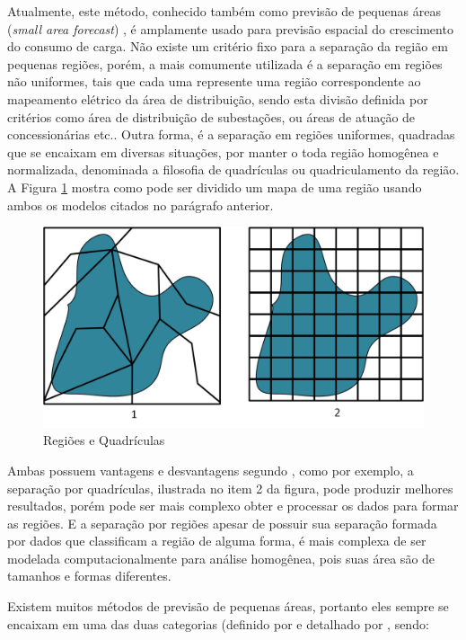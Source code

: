 Atualmente, este método, conhecido também como previsão de pequenas áreas (\emph{small area forecast}) \cite{willis1995spatial}, é amplamente usado para previsão espacial do crescimento do consumo de carga. Não existe um critério fixo para a separação da região em pequenas regiões, porém, a mais comumente utilizada é a separação em regiões não uniformes, tais que cada uma represente uma região correspondente ao mapeamento elétrico da área de distribuição, sendo esta divisão definida por critérios como área de distribuição de subestações, ou áreas de atuação de concessionárias etc.. Outra forma, é a separação em regiões uniformes, quadradas que se encaixam em diversas situações, por manter o toda região homogênea e normalizada, denominada a filosofia de quadrículas ou quadriculamento da região. A Figura \ref{fig:RegionsAndQuadrics} mostra como pode ser dividido um mapa de uma região usando ambos os modelos citados no parágrafo anterior. 

\begin{figure}[h]
	\centering	
	\includegraphics[scale=0.55]{Figuras/RegionsAndQuadrics.png}
	\caption{Regiões e Quadrículas}
	\label{fig:RegionsAndQuadrics}
\end{figure}

Ambas possuem vantagens e desvantagens segundo \citeauthor{willis2002spatial} \cite{willis2002spatial}, como por exemplo, a separação por quadrículas, ilustrada no item 2 da figura, pode produzir melhores resultados, porém pode ser mais complexo obter e processar os dados para formar as regiões. E a separação por regiões apesar de possuir sua separação formada por dados que classificam a região de alguma forma, é mais complexa de ser modelada computacionalmente para análise homogênea, pois suas área são de tamanhos e formas diferentes.

Existem muitos métodos de previsão de pequenas áreas, portanto eles sempre se encaixam em uma das duas categorias (definido por \citeauthor{willis2002spatial} \cite{willis2002spatial} e detalhado por \citeauthor{arango2000thesis} \cite{arango2000thesis}, sendo:

